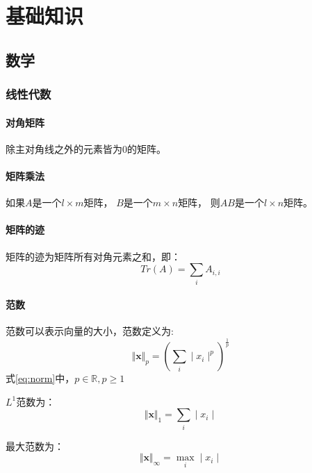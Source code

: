 \chapter{基础知识}
\section{数学}

\subsection{线性代数}
\subsubsection{对角矩阵}
除主对角线之外的元素皆为{$0$}的矩阵。

\subsubsection{矩阵乘法}
如果{$A$}是一个{$l\times m$}矩阵，
{$B$}是一个{$m\times n$}矩阵，
则{$AB$}是一个{$l\times n$}矩阵。

\subsubsection{矩阵的迹}
矩阵的迹为矩阵所有对角元素之和，即：
\begin{equation}
    \label{eq:matrix_trac}
    Tr(A)=\sum_{i}A_{i,i}
\end{equation}

\subsubsection{范数}
范数可以表示向量的大小，范数定义为:
\begin{equation}
    \label{eq:norm}
    {\Vert \bm{x} \Vert}_{p} = {\left(  \sum_{i} \mid x_i  \mid^p    \right)}^{\frac{1}{p}}
\end{equation}
式{\ref{eq:norm}}中，{$p \in \mathbb{R}, p\geq 1$}

{$L^1$}范数为：
\begin{equation}
    \label{eq:l1_norm}
    \Vert \bm{x} \Vert_{1} =  \sum_{i} \mid x_i \mid
\end{equation}

最大范数为：
\begin{equation}
    \label{eq:max_norm}
    \Vert \bm{x} \Vert_{\infty} = \max_i \mid x_i \mid
\end{equation}


